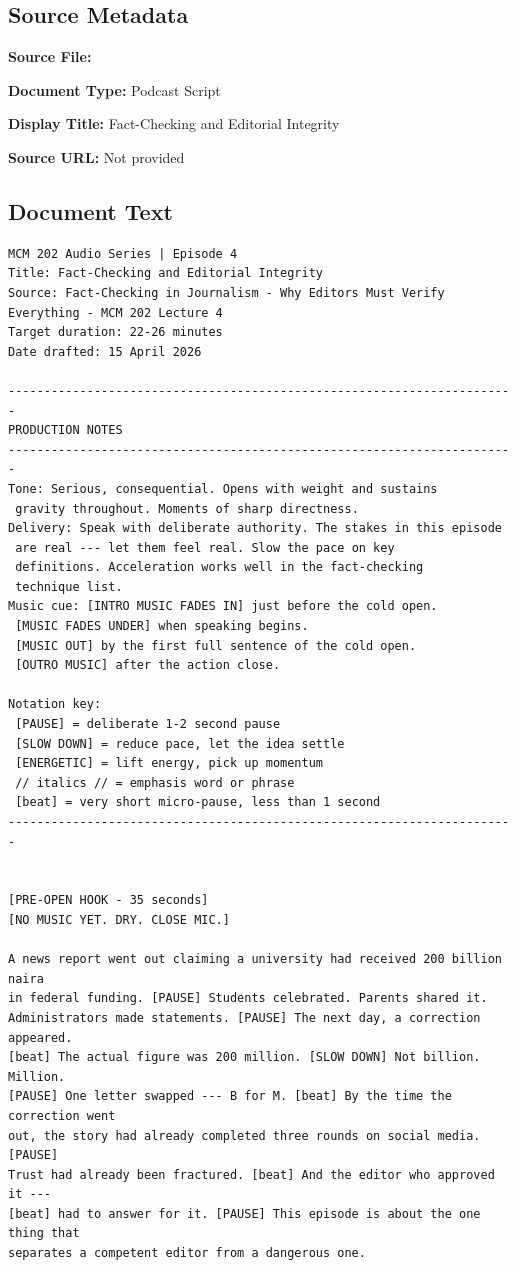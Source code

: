 \subsection*{Source Metadata}
\noindent\textbf{Source File:} \par
\noindent\textbf{Document Type:} Podcast Script\par
\noindent\textbf{Display Title:} Fact-Checking and Editorial Integrity\par
\noindent\textbf{Source URL:} Not provided\par

\subsection*{Document Text}
{\small
\begin{Verbatim}
MCM 202 Audio Series | Episode 4
Title: Fact-Checking and Editorial Integrity
Source: Fact-Checking in Journalism - Why Editors Must Verify Everything - MCM 202 Lecture 4
Target duration: 22-26 minutes
Date drafted: 15 April 2026

-----------------------------------------------------------------------
PRODUCTION NOTES
-----------------------------------------------------------------------
Tone: Serious, consequential. Opens with weight and sustains
 gravity throughout. Moments of sharp directness.
Delivery: Speak with deliberate authority. The stakes in this episode
 are real --- let them feel real. Slow the pace on key
 definitions. Acceleration works well in the fact-checking
 technique list.
Music cue: [INTRO MUSIC FADES IN] just before the cold open.
 [MUSIC FADES UNDER] when speaking begins.
 [MUSIC OUT] by the first full sentence of the cold open.
 [OUTRO MUSIC] after the action close.

Notation key:
 [PAUSE] = deliberate 1-2 second pause
 [SLOW DOWN] = reduce pace, let the idea settle
 [ENERGETIC] = lift energy, pick up momentum
 // italics // = emphasis word or phrase
 [beat] = very short micro-pause, less than 1 second
-----------------------------------------------------------------------


[PRE-OPEN HOOK - 35 seconds]
[NO MUSIC YET. DRY. CLOSE MIC.]

A news report went out claiming a university had received 200 billion naira
in federal funding. [PAUSE] Students celebrated. Parents shared it.
Administrators made statements. [PAUSE] The next day, a correction appeared.
[beat] The actual figure was 200 million. [SLOW DOWN] Not billion. Million.
[PAUSE] One letter swapped --- B for M. [beat] By the time the correction went
out, the story had already completed three rounds on social media. [PAUSE]
Trust had already been fractured. [beat] And the editor who approved it ---
[beat] had to answer for it. [PAUSE] This episode is about the one thing that
separates a competent editor from a dangerous one.


\end{Verbatim}}
